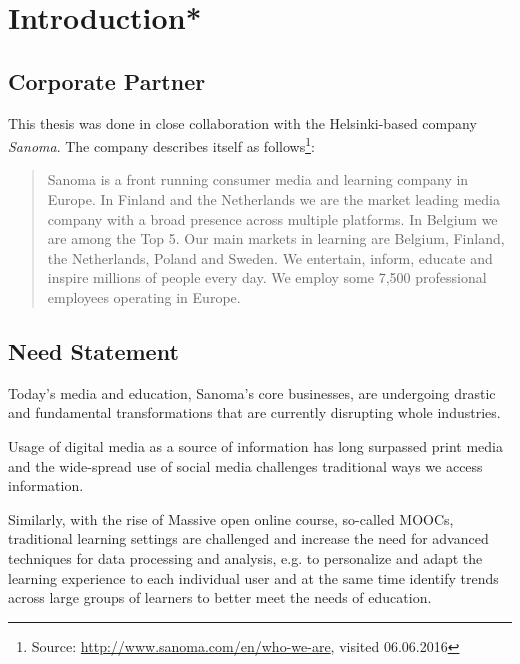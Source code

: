 
\thispagestyle{empty}


\section{Introduction*}


\subsection{Corporate Partner}

This thesis was done in close collaboration with the Helsinki-based company \emph{Sanoma}. The company describes itself as follows\footnote{Source: \url{http://www.sanoma.com/en/who-we-are}, visited 06.06.2016}:

\blockquote{Sanoma is a front running consumer media and learning company in Europe. In Finland and the Netherlands we are the market leading media company with a broad presence across multiple platforms. In Belgium we are among the Top 5. Our main markets in learning are Belgium, Finland, the Netherlands, Poland and Sweden. We entertain, inform, educate and inspire millions of people every day. We employ some 7,500 professional employees operating in Europe.}

\subsection{Need Statement}

Today's media and education, Sanoma's core businesses, are undergoing drastic and fundamental transformations that are currently disrupting whole industries. 

Usage of digital media as a source of information has long surpassed print media  and the wide-spread use of social media challenges traditional ways we access information. 

Similarly, with the rise of Massive open online course, so-called MOOCs, traditional learning settings are challenged and increase the need for advanced techniques for data processing and analysis, e.g. to personalize and adapt the learning experience to each individual user and at the same time identify trends across large groups of learners to better meet the needs of education.

